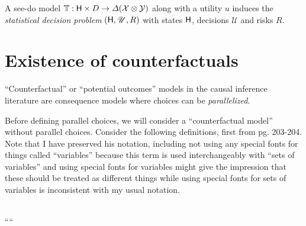 \begin{definition}
A see-do model $\mathbb{T}:\mathsf{H}\times D\to \Delta(\mathcal{X}\otimes\mathcal{Y})$ along with a utility $u$ induces the \emph{statistical decision problem} $(\mathsf{H},\mathscr{U},R)$ with states $\mathsf{H}$, decisions $\mathscr{U}$ and risks $R$.


\end{definition}


\section{Existence of counterfactuals}


``Counterfactual'' or ``potential outcomes'' models in the causal inference literature are consequence models where choices can be \emph{parallelized}. 

Before defining parallel choices, we will consider a ``counterfactual model'' without parallel choices. Consider the following definitions, first from \citet{pearl_causality:_2009} pg. 203-204. Note that I have preserved his notation, including not using any special fonts for things called ``variables'' because this term is used interchangeably with ``sets of variables'' and using special fonts for variables might give the impression that these should be treated as different things while using special fonts for sets of variables is inconsistent with my usual notation.



\\
````
